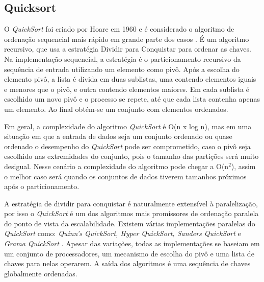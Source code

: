 \subsection{Quicksort}



O \textit{QuickSort} foi criado por Hoare em 1960 e é considerado o algoritmo de ordenação sequencial mais rápido em grande parte dos casos \cite{Cormen:2009}. É um algoritmo recursivo, que usa a estratégia Dividir para Conquistar para ordenar as chaves.
Na implementação sequencial, a estratégia é o particionamento recursivo da sequência de entrada utilizando um elemento como pivô.  
Após a escolha do elemento pivô, a lista é divida em duas sublistas, uma contendo elementos iguais e menores que o pivô,  e outra contendo elementos maiores.
Em cada sublista é escolhido um novo pivô e o processo se repete, até que cada lista contenha apenas um elemento.  Ao final obtém-se um conjunto com elementos ordenados. 

Em geral, a complexidade do algoritmo \textit{QuickSort} é O(n x log n), mas em uma situação em que a entrada de dados seja um  conjunto ordenado ou quase ordenado o desempenho do \textit{QuickSort} pode ser comprometido, caso o pivô seja escolhido nas extremidades do conjunto, pois o tamanho das partições será muito desigual. Nesse cenário a complexidade do algoritmo pode chegar a O(n$^2$), assim o melhor caso será quando os conjuntos de dados tiverem tamanhos próximos após o particionamento.
 
 
 
A estratégia de dividir para conquistar é naturalmente extensível à paralelização, por isso o \textit{QuickSort} é um dos algoritmos mais promissores de ordenação paralela do ponto de vista da escalabilidade.
Existem várias implementações paralelas do \textit{QuickSort} como: \textit{Quinn's QuickSort, Hyper QuickSort, Sanders QuickSort} e  \textit{Grama QuickSort} \cite{Quinn:1994, Sanders:1997}. Apesar das variações, todas as implementações se baseiam em um conjunto de processadores, um mecanismo de escolha do pivô e uma lista de chaves para nelas operarem. A saída dos algoritmos é uma sequência de chaves globalmente ordenadas. 

